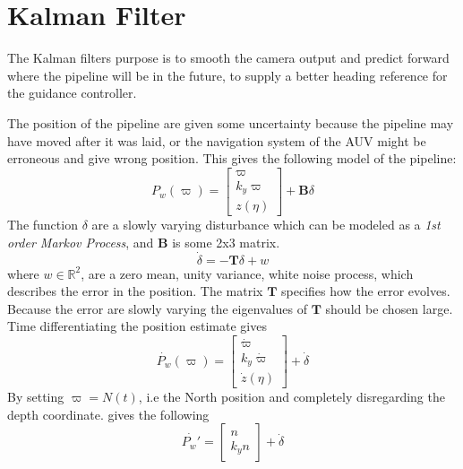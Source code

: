 	


\section{Kalman Filter}
	The Kalman filters purpose is to smooth the camera output and predict forward where the pipeline will
	be in the future, to supply a better heading reference for the guidance controller.

	The position of the pipeline are given some uncertainty because the pipeline may have moved after it
	was laid, or the navigation system of the AUV might be erroneous and give wrong position. This gives the
	following model of the pipeline:
	\begin{equation}
		P_w(\varpi) = \left [ \begin{array}{c}
					\varpi \\
					k_y \varpi \\
					z(\eta)
				\end{array} \right ] + \mathbf{B}\delta
	\end{equation}
	The function $\delta$ are a slowly varying disturbance which can be modeled as a \textit{1st order Markov
	Process}, and $\mathbf{B}$ is some 2x3 matrix.
	\begin{equation}
		\dot{\delta} = -\mathbf{T} \delta +  w
	\end{equation}
	where $w \in \mathbb{R}^2$, are a zero mean, unity variance, white noise process, which describes the
	error in the position. The matrix $\mathbf{T}$ specifies how the error evolves. Because the error are
	slowly varying the eigenvalues of $\mathbf{T}$ should be chosen large. Time differentiating
	the position estimate gives
	\begin{equation}
		\dot{P_w}(\varpi) =  \left [ \begin{array}{c}
						\dot{\varpi} \\
						k_y \dot{\varpi} \\
						\dot{z}(\eta)
					\end{array} \right ] + \dot{\delta}
	\end{equation}
	By setting $\varpi = N(t)$, i.e the North position and completely disregarding the depth coordinate.
	gives the following
	\begin{equation}
		\dot{P_w'} = \left [ \begin{array}{c}
					n \\
					k_y n 
				\end{array} \right ] + \dot{\delta}
	\end{equation}
